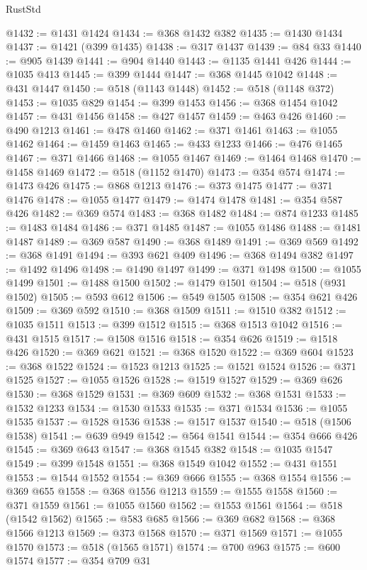 \begin{lexlean}{RustStd}
\begin{coremodule}
@1432 := @1431 @1424
@1434 := @368 @1432 @382
@1435 := @1430 @1434
@1437 := @1421 (@399 @1435)
@1438 := @317 @1437
@1439 := @84 @33
@1440 := @905 @1439
@1441 := @904 @1440
@1443 := @1135 @1441 @426
@1444 := @1035 @413
@1445 := @399 @1444
@1447 := @368 @1445 @1042
@1448 := @431 @1447
@1450 := @518 (@1143 @1448)
@1452 := @518 (@1148 @372)
@1453 := @1035 @829
@1454 := @399 @1453
@1456 := @368 @1454 @1042
@1457 := @431 @1456
@1458 := @427 @1457
@1459 := @463 @426
@1460 := @490 @1213
@1461 := @478 @1460
@1462 := @371 @1461
@1463 := @1055 @1462
@1464 := @1459 @1463
@1465 := @433 @1233
@1466 := @476 @1465
@1467 := @371 @1466
@1468 := @1055 @1467
@1469 := @1464 @1468
@1470 := @1458 @1469
@1472 := @518 (@1152 @1470)
@1473 := @354 @574
@1474 := @1473 @426
@1475 := @868 @1213
@1476 := @373 @1475
@1477 := @371 @1476
@1478 := @1055 @1477
@1479 := @1474 @1478
@1481 := @354 @587 @426
@1482 := @369 @574
@1483 := @368 @1482
@1484 := @874 @1233
@1485 := @1483 @1484
@1486 := @371 @1485
@1487 := @1055 @1486
@1488 := @1481 @1487
@1489 := @369 @587
@1490 := @368 @1489
@1491 := @369 @569
@1492 := @368 @1491
@1494 := @393 @621 @409
@1496 := @368 @1494 @382
@1497 := @1492 @1496
@1498 := @1490 @1497
@1499 := @371 @1498
@1500 := @1055 @1499
@1501 := @1488 @1500
@1502 := @1479 @1501
@1504 := @518 (@931 @1502)
@1505 := @593 @612
@1506 := @549 @1505
@1508 := @354 @621 @426
@1509 := @369 @592
@1510 := @368 @1509
@1511 := @1510 @382
@1512 := @1035 @1511
@1513 := @399 @1512
@1515 := @368 @1513 @1042
@1516 := @431 @1515
@1517 := @1508 @1516
@1518 := @354 @626
@1519 := @1518 @426
@1520 := @369 @621
@1521 := @368 @1520
@1522 := @369 @604
@1523 := @368 @1522
@1524 := @1523 @1213
@1525 := @1521 @1524
@1526 := @371 @1525
@1527 := @1055 @1526
@1528 := @1519 @1527
@1529 := @369 @626
@1530 := @368 @1529
@1531 := @369 @609
@1532 := @368 @1531
@1533 := @1532 @1233
@1534 := @1530 @1533
@1535 := @371 @1534
@1536 := @1055 @1535
@1537 := @1528 @1536
@1538 := @1517 @1537
@1540 := @518 (@1506 @1538)
@1541 := @639 @949
@1542 := @564 @1541
@1544 := @354 @666 @426
@1545 := @369 @643
@1547 := @368 @1545 @382
@1548 := @1035 @1547
@1549 := @399 @1548
@1551 := @368 @1549 @1042
@1552 := @431 @1551
@1553 := @1544 @1552
@1554 := @369 @666
@1555 := @368 @1554
@1556 := @369 @655
@1558 := @368 @1556 @1213
@1559 := @1555 @1558
@1560 := @371 @1559
@1561 := @1055 @1560
@1562 := @1553 @1561
@1564 := @518 (@1542 @1562)
@1565 := @583 @685
@1566 := @369 @682
@1568 := @368 @1566 @1213
@1569 := @373 @1568
@1570 := @371 @1569
@1571 := @1055 @1570
@1573 := @518 (@1565 @1571)
@1574 := @700 @963
@1575 := @600 @1574
@1577 := @354 @709 @31

\end{coremodule}
\end{lexlean}
